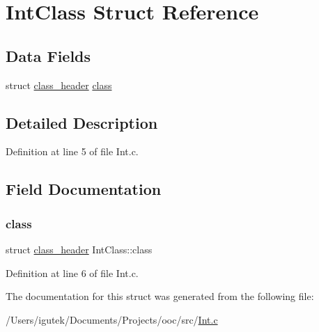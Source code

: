 \hypertarget{structIntClass}{}\section{Int\+Class Struct Reference}
\label{structIntClass}
\subsection*{Data Fields}
\begin{DoxyCompactItemize}
\item 
struct \mbox{\hyperlink{structclass__header}{class\+\_\+header}} \mbox{\hyperlink{structIntClass_a434c7c785b8a61096c69491220ab8543}{class}}
\end{DoxyCompactItemize}


\subsection{Detailed Description}


Definition at line 5 of file Int.\+c.



\subsection{Field Documentation}
\mbox{\label{structIntClass_a434c7c785b8a61096c69491220ab8543}} 
\subsubsection{\texorpdfstring{class}{class}}
{\footnotesize\ttfamily struct \mbox{\hyperlink{structclass__header}{class\+\_\+header}} Int\+Class\+::class}



Definition at line 6 of file Int.\+c.



The documentation for this struct was generated from the following file\+:\begin{DoxyCompactItemize}
\item 
/\+Users/igutek/\+Documents/\+Projects/ooc/src/\mbox{\hyperlink{Int_8c}{Int.\+c}}\end{DoxyCompactItemize}
